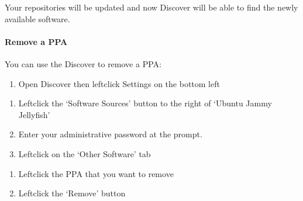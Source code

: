 \documentclass[letterpaper,10pt,english]{sphinxmanual}
\begin{document}

\sphinxAtStartPar
Your repositories will be updated and now Discover will be able to find the newly available software.


\paragraph{Remove a PPA}
\label{\detokenize{docs/software-management/repositories:remove-a-ppa}}
\sphinxAtStartPar
You can use the Discover to remove a PPA:
\begin{enumerate}
%
\item {} 
\sphinxAtStartPar
Open Discover then left\sphinxhyphen{}click Settings on the bottom left

\end{enumerate}

\begin{enumerate}
%
\setcounter{enumi}{1}
\item {} 
\sphinxAtStartPar
Left\sphinxhyphen{}click the ‘Software Sources’ button to the right of ‘Ubuntu Jammy Jellyfish’

\item {} 
\sphinxAtStartPar
Enter your administrative password at the prompt.

\item {} 
\sphinxAtStartPar
Left\sphinxhyphen{}click on the ‘Other Software’ tab

\end{enumerate}

\begin{enumerate}
%
\setcounter{enumi}{4}
\item {} 
\sphinxAtStartPar
Left\sphinxhyphen{}click the PPA that you want to remove

\item {} 
\sphinxAtStartPar
Left\sphinxhyphen{}click the ‘Remove’ button

\end{enumerate}
\end{document}
